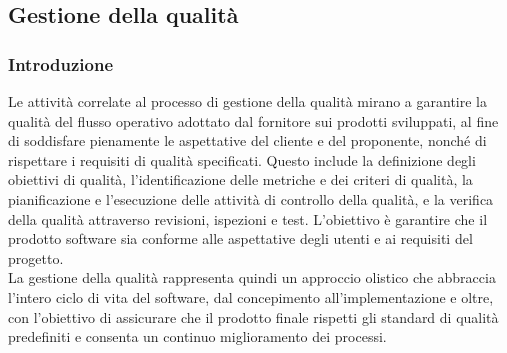\subsection{Gestione della qualità}
\subsubsection{Introduzione}
Le attività correlate al processo di gestione della qualità mirano a garantire la qualità del flusso operativo adottato dal fornitore sui prodotti sviluppati, al fine di soddisfare pienamente le aspettative del cliente e del proponente, nonché di rispettare i requisiti di qualità specificati. Questo include la definizione degli obiettivi di qualità, l'identificazione delle metriche e dei criteri di qualità, la pianificazione e l'esecuzione delle attività di controllo della qualità, e la verifica della qualità attraverso revisioni, ispezioni e test. L'obiettivo è garantire che il prodotto software sia conforme alle aspettative degli utenti e ai requisiti del progetto. \\
La gestione della qualità rappresenta quindi un approccio olistico che abbraccia l'intero ciclo di vita del software, dal concepimento all'implementazione e oltre, con l'obiettivo di assicurare che il prodotto finale rispetti gli standard di qualità predefiniti e consenta un continuo miglioramento dei processi.

